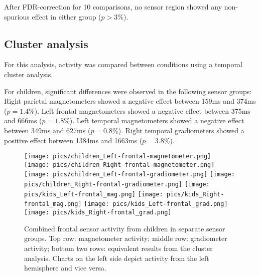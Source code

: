 After FDR-correction for 10 comparisons, no sensor region showed any non-spurious effect in either group ($p > 3\%$).

\subsection{Cluster analysis}
For this analysis, activity was compared between conditions using a temporal cluster analysis.

For children, significant differences were observed in the following sensor groups:
Right parietal magnetometers showed a negative effect between 159ms and 374ms ($p = 1.4\%$).
Left frontal magnetometers showed a negative effect between 375ms and 666ms ($p = 1.8\%$).
Left temporal magnetometers showed a negative effect between 349ms and 627ms ($p = 0.8\%$).
Right temporal gradiometers showed a positive effect between 1384ms and 1663ms ($p = 3.8\%$).

\begin{figure}[!h]
\begin{center}
\texttt{[image: pics/children\_Left-frontal-magnetometer.png]}
\texttt{[image: pics/children\_Right-frontal-magnetometer.png]}
\texttt{[image: pics/children\_Left-frontal-gradiometer.png]}
\texttt{[image: pics/children\_Right-frontal-gradiometer.png]}
\texttt{[image: pics/kids\_Left-frontal\_mag.png]}
\texttt{[image: pics/kids\_Right-frontal\_mag.png]}
\texttt{[image: pics/kids\_Left-frontal\_grad.png]}
\texttt{[image: pics/kids\_Right-frontal\_grad.png]}
\caption{\label{4.2.activity.kids.frontal} Combined frontal sensor activity from children in separate sensor groups. Top row: magnetometer activity; middle row: gradiometer activity; bottom two rows: equivalent results from the cluster analysis. Charts on the left side depict activity from the left hemisphere and vice versa.}
\end{center}
\end{figure}



